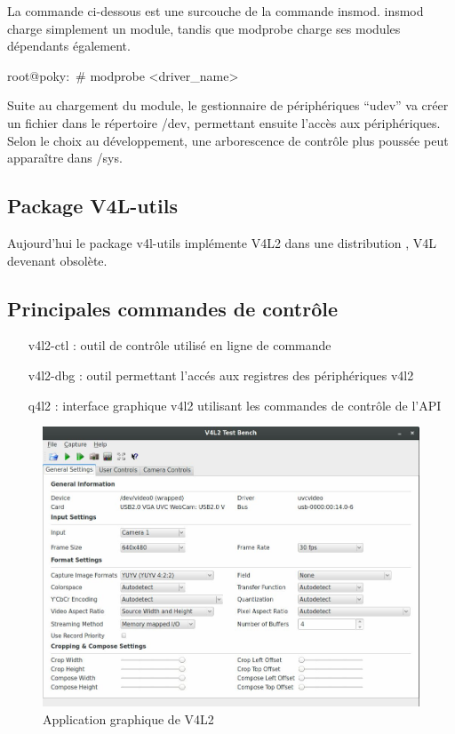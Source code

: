 La commande ci-dessous est une surcouche de la commande insmod. insmod charge
simplement un module, tandis que modprobe charge ses modules dépendants également.

\begin{tcolorbox}
    root@poky:~\# modprobe <driver\_name>
\end{tcolorbox}

Suite au chargement du module, le gestionnaire de périphériques “udev” va créer un
fichier dans le répertoire /dev, permettant ensuite l’accès aux périphériques. Selon le choix
au développement, une arborescence de contrôle plus poussée peut apparaître dans /sys.

\subsection{Package V4L-utils}

Aujourd'hui le package v4l-utils implémente V4L2 dans une distribution , V4L devenant obsolète.

\subsection{Principales commandes de contrôle}

\begin{itemize}
    \item[v4l2-ctl : ]  outil de contrôle utilisé en ligne de commande
    \item[v4l2-dbg : ] outil permettant l'accés aux registres des périphériques v4l2
    \item[q4l2 : ] interface graphique v4l2 utilisant les commandes de contrôle de l'API
\end{itemize}

\begin{figure}[!htb]
    \centering
    \includegraphics[trim={0cm 0cm 0cm 0cm},clip,scale=0.35]{Figures/v4l2.png}
    \decoRule
    \caption{Application graphique de V4L2} \label{fig:v4l2}
\end{figure}

